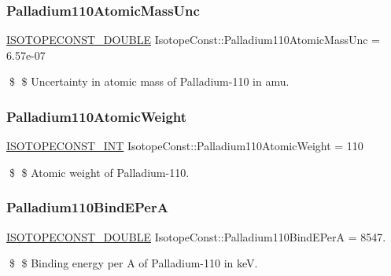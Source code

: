 \subsubsection{\texorpdfstring{Palladium110\+Atomic\+Mass\+Unc}{Palladium110AtomicMassUnc}}
{\footnotesize\ttfamily \mbox{\hyperlink{group___isotope_const-_macros_ga8f45a7272ce02c0b4c65c44636ed719a}{I\+S\+O\+T\+O\+P\+E\+C\+O\+N\+S\+T\+\_\+\+D\+O\+U\+B\+LE}} Isotope\+Const\+::\+Palladium110\+Atomic\+Mass\+Unc = 6.\+57e-\/07}

\$ \$ Uncertainty in atomic mass of Palladium-\/110 in amu. \mbox{\label{group___isotope_const-_palladium-_pd110_gaea156b66d5668612cc8b08f7145c0a60}} 
\subsubsection{\texorpdfstring{Palladium110\+Atomic\+Weight}{Palladium110AtomicWeight}}
{\footnotesize\ttfamily \mbox{\hyperlink{group___isotope_const-_macros_ga5f18360b3e99483a35c32d789e62621c}{I\+S\+O\+T\+O\+P\+E\+C\+O\+N\+S\+T\+\_\+\+I\+NT}} Isotope\+Const\+::\+Palladium110\+Atomic\+Weight = 110}

\$ \$ Atomic weight of Palladium-\/110. \mbox{\label{group___isotope_const-_palladium-_pd110_ga7ce3e004104e678e1c559917e9939d3e}} 
\subsubsection{\texorpdfstring{Palladium110\+Bind\+E\+PerA}{Palladium110BindEPerA}}
{\footnotesize\ttfamily \mbox{\hyperlink{group___isotope_const-_macros_ga8f45a7272ce02c0b4c65c44636ed719a}{I\+S\+O\+T\+O\+P\+E\+C\+O\+N\+S\+T\+\_\+\+D\+O\+U\+B\+LE}} Isotope\+Const\+::\+Palladium110\+Bind\+E\+PerA = 8547.}

\$ \$ Binding energy per A of Palladium-\/110 in keV. \mbox{\label{group___isotope_const-_palladium-_pd110_ga6b391b7fdf4f0b571ab87758a000094d}} 
